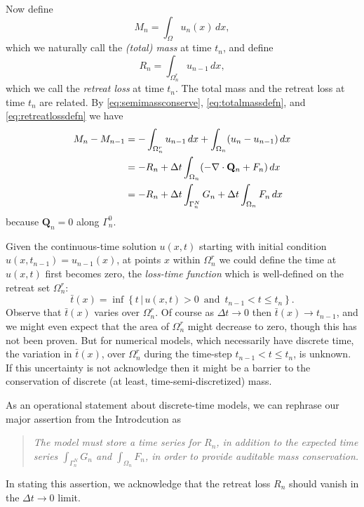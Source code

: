 \documentclass[final,leqno,onefignum,onetabnum]{siamltex1213bueler}
\newcommand\bQ{\mathbf{Q}}
\newcommand{\Div}{\nabla\cdot}
\begin{document}
Now define
\begin{equation}
M_n = \int_\Omega u_n(x)\,dx, \label{eq:totalmassdefn}
\end{equation}
which we naturally call the \emph{(total) mass} at time $t_n$, and define
\begin{equation}
R_n = \int_{\Omega_n^r} u_{n-1}\,dx, \label{eq:retreatlossdefn}
\end{equation}
which we call the \emph{retreat loss} at time $t_n$.  The total mass and the retreat loss at time $t_n$ are related.  By \eqref{eq:semimassconserve}, \eqref{eq:totalmassdefn}, and \eqref{eq:retreatlossdefn} we have
\begin{align}
M_n - M_{n-1} &=  - \int_{\Omega_n^r} u_{n-1}\,dx + \int_{\Omega_n} (u_n - u_{n-1})\,dx \label{eq:massstep} \\
   &= - R_n + \Delta t \int_{\Omega_n} (- \Div \bQ_n + F_n) \,dx \notag \\
   &= - R_n + \Delta t \int_{\Gamma_n^N} G_n + \Delta t \int_{\Omega_n} F_n\,dx \notag
\end{align}
because $\bQ_n=0$ along $\Gamma_n^0$.

Given the continuous-time solution $u(x,t)$ starting with initial condition $u(x,t_{n-1}) = u_{n-1}(x)$, at points $x$ within $\Omega_n^r$ we could define the time at $u(x,t)$ first becomes zero, the \emph{loss-time function} which is well-defined on the retreat set $\Omega_n^r$:
\begin{equation}
\bar t(x) = \inf\left\{t \,\big|\, u(x,t)>0 \,\text{ and }\, t_{n-1} < t \le t_n\right\}.
\end{equation}
Observe that $\bar t(x)$ varies over $\Omega_n^r$.  Of course as $\Delta t \to 0$ then $\bar t(x) \to t_{n-1}$, and we might even expect that the area of $\Omega_n^r$ might decrease to zero, though this has not been proven.  But for numerical models, which necessarily have discrete time, the variation in $\bar t(x)$, over $\Omega_n^r$ during the time-step $t_{n-1} < t \le t_n$, is unknown.  If this uncertainty is not acknowledge then it might be a barrier to the conservation of discrete (at least, time-semi-discretized) mass.

As an operational statement about discrete-time models, we can rephrase our major assertion from the Introdcution as
\begin{quote}
\emph{The model must store a time series for $R_n$, in addition to the expected time series $\int_{\Gamma_n^N} G_n$ and $\int_{\Omega_n} F_n$, in order to provide auditable mass conservation.}
\end{quote}
In stating this assertion, we acknowledge that the retreat loss $R_n$ should vanish in the $\Delta t\to 0$ limit.
\end{document}
